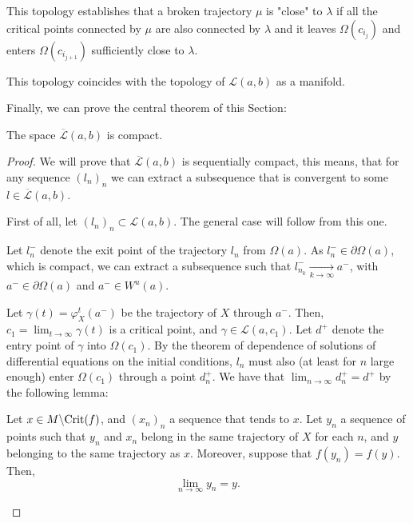 This topology establishes that a broken trajectory $\mu$ is "close" to $\lambda$ if all the critical points connected by $\mu$ are also connected by $\lambda$ and it leaves $\Omega(c_{i_j})$ and enters $\Omega(c_{i_{j+1}})$ sufficiently close to $\lambda$.

\begin{rmrk}
This topology coincides with the topology of $\mathcal{L}(a,b)$ as a manifold.
\end{rmrk}

Finally, we can prove the central theorem of this Section:

\begin{theo}
The space $\overline{\mathcal{L}}(a,b)$ is compact.
\end{theo}

\begin{proof}
We will prove that $\overline{\mathcal{L}}(a,b)$ is sequentially compact, this means, that for any sequence $(l_n)_n$ we can extract a subsequence that is convergent to some $l \in \overline{\mathcal{L}}(a,b)$.

First of all, let $(l_n)_n \subset \mathcal{L}(a,b)$. The general case will follow from this one.

Let $l_n^{-}$ denote the exit point of the trajectory $l_n$ from $\Omega(a)$. As $l_n^- \in \partial \Omega(a)$, which is compact, we can extract a subsequence such that $l_{n_k}^- \xrightarrow[k \rightarrow \infty]{} a^-$, with $a^- \in \partial \Omega(a)$ and $a^- \in W^u(a)$.

Let $\gamma(t) = \varphi^t_X(a^-)$ be the trajectory of $X$ through $a^-$. Then, $c_1 = \displaystyle\lim_{t \rightarrow \infty} \gamma(t)$ is a critical point, and $\gamma \in \mathcal{L}(a,c_1)$. Let $d^+$ denote the entry point of $\gamma$ into $\Omega(c_1)$. By the theorem of dependence of solutions of differential equations on the initial conditions, $l_n$ must also (at least for $n$ large enough) enter $\Omega(c_1)$ through a point $d_n^+$. We have that $\displaystyle\lim_{n \rightarrow \infty} d_n^+ = d^+$ by the following lemma:

\begin{lema} \label{morse_sequences}
Let $x \in M \backslash \mathrm{Crit}(f)$, and $(x_n)_n$ a sequence that tends to $x$. Let $y_n$ a sequence of points such that $y_n$ and $x_n$ belong in the same trajectory of $X$ for each $n$, and $y$ belonging to the same trajectory as $x$. Moreover, suppose that $f(y_n) = f(y)$. Then,
\[\lim_{n \rightarrow \infty} y_n = y .\]
\end{lema}


\end{proof}
